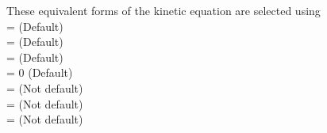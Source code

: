 These equivalent forms of the kinetic equation are selected using \\
 = \true  \;\;\; (Default) \\
 = \true \;\;\; (Default) \\
 = \false \;\;\; (Default) \\
 = 0 \;\;\; (Default) \\
 = \true \;\;\; (Not default) \\
 = \true \;\;\; (Not default) \\
 = \true \;\;\; (Not default)



